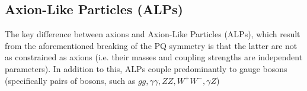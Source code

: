 \documentclass{article}
\begin{document}
\subsection{Axion-Like Particles (ALPs)}
The key difference between axions and Axion-Like Particles (ALPs), which result from the aforementioned breaking of the PQ symmetry is that the latter are not as constrained as axions (i.e. their masses and coupling strengths are independent parameters). 
In addition to this, ALPs couple predominantly to gauge bosons (specifically pairs of bosons, such as $gg, \gamma\gamma, ZZ, W^{+}W^{-}, \gamma Z$)
\end{document}
